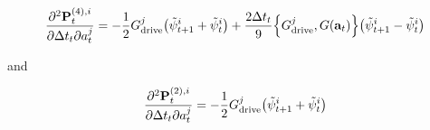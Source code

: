 \documentclass{article}
\newcommand{\isopsi}{\tilde \psi}
\begin{document}
\begin{equation}
  \pdv{\vb{P}_t^{(4),i}}{\Delta t_t}{a^j_t} 
    = -\frac{1}{2} G^j_{\text{drive}} \qty(\isopsi^i_{t+1} + \isopsi^i_{t}) 
    + \frac{2 \Delta t_t}{9} \qty{G^j_{\text{drive}}, G(\vb{a}_t)}\qty(\isopsi^i_{t+1} - \isopsi^i_{t})
\end{equation}

and


\begin{equation}
  \pdv{\vb{P}_t^{(2),i}}{\Delta t_t}{a^j_t} 
    = -\frac{1}{2} G^j_{\text{drive}} \qty(\isopsi^i_{t+1} + \isopsi^i_{t}) 
\end{equation}








    
\end{document}
